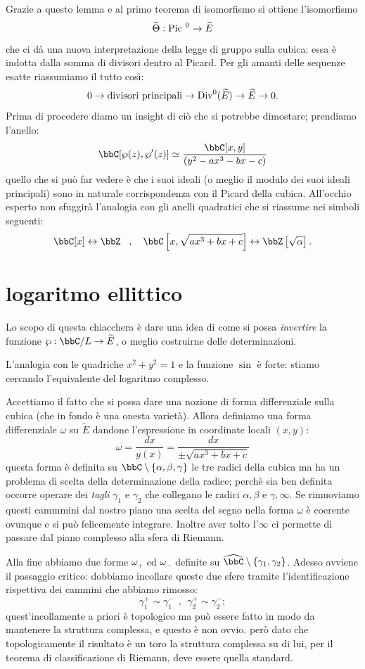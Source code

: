 Grazie a questo lemma e al primo teorema di isomorfismo si ottiene l'isomorfismo
$$
\widetilde{\Theta}: \mbox{Pic }^0 \rightarrow \widetilde{E}
$$
che ci dà una nuova interpretazione della legge di gruppo sulla cubica: essa è indotta dalla somma di divisori dentro al Picard. Per gli amanti delle sequenze esatte riassumiamo il tutto così:
$$
0\rightarrow\mbox{divisori principali}\rightarrow \mbox{Div}^0(\widetilde{E})\rightarrow \widetilde{E}\rightarrow 0.
$$
Prima di procedere diamo un insight di ciò che si potrebbe dimostare; prendiamo l'anello:
$$
\bbC[\wp(z),\wp'(z)]\simeq\frac{\bbC[x,y]}{(y^2 - ax^3 - bx - c)}
$$
quello che si può far vedere è che i suoi ideali (o meglio il modulo dei suoi ideali principali) sono in naturale corrispondenza con il Picard della cubica. All'occhio esperto non sfuggirà l'analogia con gli anelli quadratici che si riassume nei simboli seguenti:
$$
\bbC[x] \leftrightarrow \bbZ\, \ \ , \ \ \ \bbC\left[x,\sqrt{ax^3+bx+c}\right] \leftrightarrow \bbZ\left[\sqrt{\alpha}\right].
$$ 
\section{logaritmo ellittico}
Lo scopo di questa chiacchera è dare una idea di come si possa {\it invertire} la funzione $\wp: \bbC/L \rar \widetilde{E}$, o meglio costruirne delle determinazioni.

L'analogia con le quadriche $x^2+y^2=1$ e la funzione $\sin$ è forte: stiamo cercando l'equivalente del logaritmo complesso.

Accettiamo il fatto che si possa dare una nozione di forma differenziale sulla cubica (che in fondo è una onesta varietà). Allora definiamo una forma differenziale $\omega$ su $\widetilde{E}$ dandone l'espressione in coordinate locali $(x,y)$:
$$
\omega=\frac{dx}{y(x)}=\frac{dx}{\pm\sqrt{ax^3+bx+c}}
$$
questa forma è definita su $\bbC\setminus\{\alpha, \beta, \gamma\}$ le tre radici della cubica ma ha un problema di scelta della determinazione della radice; perchè sia ben definita occorre operare dei {\it tagli} $\gamma_1$ e $\gamma_2$ che collegano le radici $\alpha,\beta$ e $\gamma,\infty$. Se rimuoviamo questi cammmini dal nostro piano una scelta del segno nella forma $\omega$ è coerente ovunque e si può felicemente integrare. Inoltre aver tolto l'$\infty$ ci permette di passare dal piano complesso alla sfera di Riemann.

Alla fine abbiamo due forme $\omega_+$ ed $\omega_-$ definite su $\widehat{\bbC}\setminus\{\gamma_1,\gamma_2\}$. Adesso avviene il passaggio critico: dobbiamo incollare queste due sfere tramite l'identificazione rispettiva dei cammini che abbiamo rimosso:
$$
\gamma_1^+\sim \gamma_1^-\ \ , \ \ \gamma_2^+\sim\gamma_2^-;
$$
quest'incollamente a priori è topologico ma può essere fatto in modo da mantenere la struttura complessa, e questo è non ovvio. però dato che topologicamente il risultato è un toro la struttura complessa su di lui, per il teorema di classificazione di Riemann, deve essere quella standard.

